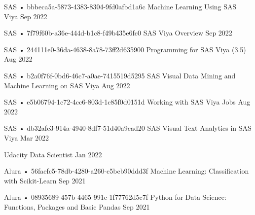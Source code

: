 \begin{cventries}
  \cventry
    {SAS • bbbeca5a-5873-4383-8304-9fd0afbd1a6c} %
    {Machine Learning Using SAS Viya} %
    {} %
    {Sep 2022} %
    {}

  \cventry
    {SAS • 7f79f60b-a36e-444d-b1c8-f49b435e6fc0} %
    {SAS Viya Overview} %
    {} %
    {Sep 2022} %
    {}

  \cventry
    {SAS • 244111e0-36da-4638-8a78-73ff2d635900} %
    {Programming for SAS Viya (3.5)} %
    {} %
    {Aug 2022} %
    {}

  \cventry
    {SAS • b2a0f76f-0bd6-46c7-a0ae-7415519d5295} %
    {SAS Visual Data Mining and Machine Learning on SAS Viya} %
    {} %
    {Aug 2022} %
    {}

  \cventry
    {SAS • e5b06794-1c72-4cc6-803d-1c85f0d0151d} %
    {Working with SAS Viya Jobs} %
    {} %
    {Aug 2022} %
    {}

  \cventry
    {SAS • db32afc3-914a-4940-8df7-51d40a9cad20} %
    {SAS Visual Text Analytics in SAS Viya} %
    {} %
    {Mar 2022} %
    {}

  \cventry
    {Udacity} %
    {Data Scientist} %
    {} %
    {Jan 2022} %
    {}

  \cventry
    {Alura • 56faefc5-78db-4280-a260-c5bcb90ddd3f} %
    {Machine Learning: Classification with Scikit-Learn} %
    {} %
    {Sep 2021} %
    {}

  \cventry
    {Alura • 08935689-457b-4465-991c-1f77762d5c7f} %
    {Python for Data Science: Functions, Packages and Basic Pandas} %
    {} %
    {Sep 2021} %
    {}


\end{cventries}
